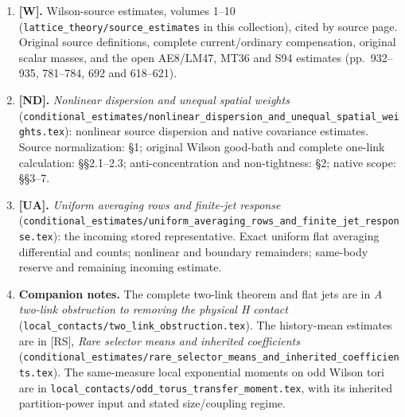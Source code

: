 \documentclass[
  11pt,
]{article}
\begin{document}
\begin{enumerate}
\def\labelenumi{\arabic{enumi}.}
\item
  \textbf{[W].} Wilson-source estimates, volumes 1--10
  (\texttt{lattice\_theory/source\_estimates} in this collection), cited by source page.
  Original source definitions, complete current/ordinary
  compensation, original scalar masses, and the open AE8/LM47, MT36 and
  S94 estimates (pp.~932--935, 781--784, 692 and 618--621).
\item
  \textbf{[ND].} \emph{Nonlinear dispersion and unequal spatial weights}
  (\texttt{conditional\_estimates/nonlinear\_dispersion\_and\_unequal\_spatial\_weights.tex}): nonlinear source dispersion and
  native covariance estimates. Source
  normalization: §1; original Wilson good-bath and complete one-link
  calculation: §§2.1--2.3; anti-concentration and non-tightness: §2;
  native scope: §§3--7.
\item
  \textbf{[UA].} \emph{Uniform averaging rows and finite-jet response}
  (\texttt{conditional\_estimates/uniform\_averaging\_rows\_and\_finite\_jet\_response.tex}): the incoming stored representative.
  Exact uniform flat averaging
  differential and counts; nonlinear and boundary remainders;
  same-body reserve and remaining incoming estimate.
\item
  \textbf{Companion notes.} The complete two-link theorem and flat jets are in
  \emph{A two-link obstruction to removing the physical H contact}
  (\texttt{local\_contacts/two\_link\_obstruction.tex}). The history-mean estimates
  are in [RS], \emph{Rare selector means and inherited coefficients}
  (\texttt{conditional\_estimates/rare\_selector\_means\_and\_inherited\_coefficients.tex}). The same-measure local exponential moments
  on odd Wilson tori are in \texttt{local\_contacts/odd\_torus\_transfer\_moment.tex}, with its inherited
  partition-power input and stated size/coupling regime.

\end{enumerate}
\end{document}
